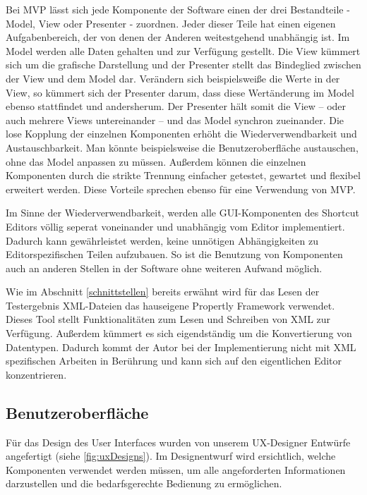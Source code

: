 Bei MVP lässt sich jede Komponente der Software einen der drei Bestandteile - Model, View oder Presenter - zuordnen. Jeder dieser Teile hat einen eigenen Aufgabenbereich, der von denen der Anderen weitestgehend unabhängig ist. Im Model werden alle Daten gehalten und zur Verfügung gestellt. Die View kümmert sich um die grafische Darstellung und der Presenter stellt das Bindeglied zwischen der View und dem Model dar. Verändern sich beispielsweiße die Werte in der View, so kümmert sich der Presenter darum, dass diese Wertänderung im Model ebenso stattfindet und andersherum. Der Presenter hält somit die View -- oder auch mehrere Views untereinander -- und das Model synchron zueinander. Die lose Kopplung der einzelnen Komponenten erhöht die Wiederverwendbarkeit und Austauschbarkeit. Man könnte beispielsweise die Benutzeroberfläche austauschen, ohne das Model anpassen zu müssen. Außerdem können die einzelnen Komponenten durch die strikte Trennung einfacher getestet, gewartet und flexibel erweitert werden. Diese Vorteile sprechen ebenso für eine Verwendung von MVP.

Im Sinne der Wiederverwendbarkeit, werden alle GUI-Komponenten des Shortcut Editors völlig seperat voneinander und unabhängig vom Editor implementiert. Dadurch kann gewährleistet werden, keine unnötigen Abhängigkeiten zu Editorspezifischen Teilen aufzubauen. So ist die Benutzung von Komponenten auch an anderen Stellen in der Software ohne weiteren Aufwand möglich.

Wie im Abschnitt \ref{schnittstellen} bereits erwähnt wird für das Lesen der Testergebnis XML-Dateien das hauseigene Propertly Framework verwendet. Dieses Tool stellt Funktionalitäten zum Lesen und Schreiben von XML zur Verfügung. Außerdem kümmert es sich eigendständig um die Konvertierung von Datentypen. Dadurch kommt der Autor bei der Implementierung nicht mit XML spezifischen Arbeiten in Berührung und kann sich auf den eigentlichen Editor konzentrieren.

\newpage

\subsection{Benutzeroberfläche}

Für das Design des User Interfaces wurden von unserem UX-Designer Entwürfe angefertigt (siehe \autoref{fig:uxDesigns}). Im Designentwurf wird ersichtlich, welche Komponenten verwendet werden müssen, um alle angeforderten Informationen darzustellen und die bedarfsgerechte Bedienung zu ermöglichen.

